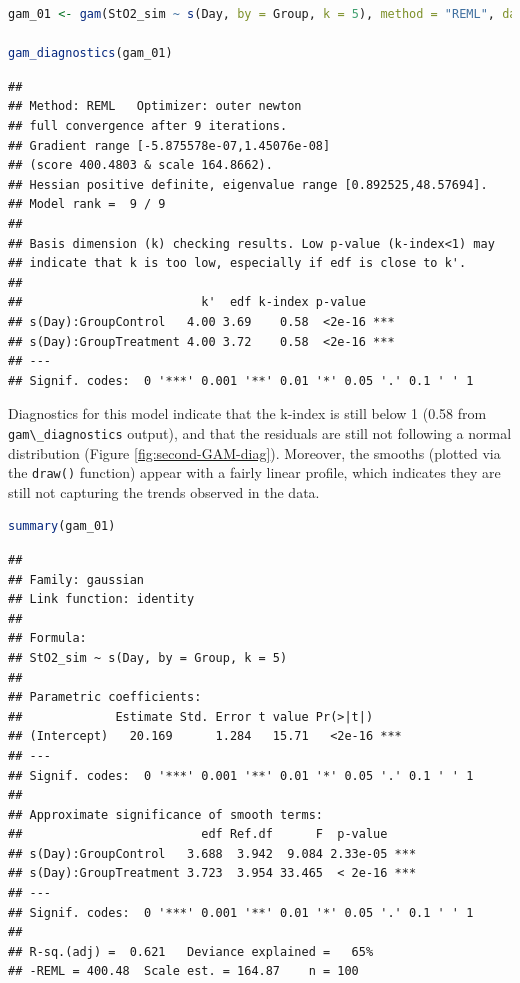 \documentclass[
]{article}
\newcommand{\passthrough}[1]{#1}
\begin{document}
\begin{lstlisting}[language=R]
gam_01 <- gam(StO2_sim ~ s(Day, by = Group, k = 5), method = "REML", data = dat_sim)

gam_diagnostics(gam_01)
\end{lstlisting}

\begin{lstlisting}
## 
## Method: REML   Optimizer: outer newton
## full convergence after 9 iterations.
## Gradient range [-5.875578e-07,1.45076e-08]
## (score 400.4803 & scale 164.8662).
## Hessian positive definite, eigenvalue range [0.892525,48.57694].
## Model rank =  9 / 9 
## 
## Basis dimension (k) checking results. Low p-value (k-index<1) may
## indicate that k is too low, especially if edf is close to k'.
## 
##                         k'  edf k-index p-value    
## s(Day):GroupControl   4.00 3.69    0.58  <2e-16 ***
## s(Day):GroupTreatment 4.00 3.72    0.58  <2e-16 ***
## ---
## Signif. codes:  0 '***' 0.001 '**' 0.01 '*' 0.05 '.' 0.1 ' ' 1
\end{lstlisting}

Diagnostics for this model indicate that the k-index is still below 1 (0.58 from \passthrough{\lstinline!gam\_diagnostics!} output), and that the residuals are still not following a normal distribution (Figure \ref{fig:second-GAM-diag}). Moreover, the smooths (plotted via the \passthrough{\lstinline!draw()!} function) appear with a fairly linear profile, which indicates they are still not capturing the trends observed in the data.

\begin{lstlisting}[language=R]
summary(gam_01)
\end{lstlisting}

\begin{lstlisting}
## 
## Family: gaussian 
## Link function: identity 
## 
## Formula:
## StO2_sim ~ s(Day, by = Group, k = 5)
## 
## Parametric coefficients:
##             Estimate Std. Error t value Pr(>|t|)    
## (Intercept)   20.169      1.284   15.71   <2e-16 ***
## ---
## Signif. codes:  0 '***' 0.001 '**' 0.01 '*' 0.05 '.' 0.1 ' ' 1
## 
## Approximate significance of smooth terms:
##                         edf Ref.df      F  p-value    
## s(Day):GroupControl   3.688  3.942  9.084 2.33e-05 ***
## s(Day):GroupTreatment 3.723  3.954 33.465  < 2e-16 ***
## ---
## Signif. codes:  0 '***' 0.001 '**' 0.01 '*' 0.05 '.' 0.1 ' ' 1
## 
## R-sq.(adj) =  0.621   Deviance explained =   65%
## -REML = 400.48  Scale est. = 164.87    n = 100
\end{lstlisting}
\end{document}
